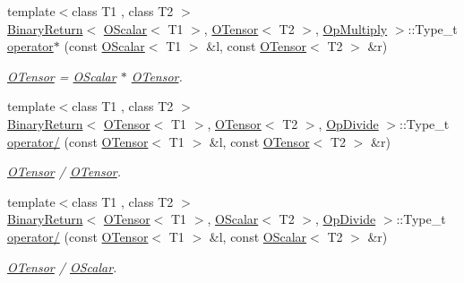 \begin{DoxyCompactItemize}
{\footnotesize template$<$class T1 , class T2 $>$ }\\\mbox{\hyperlink{structENSEM_1_1BinaryReturn}{Binary\+Return}}$<$ \mbox{\hyperlink{classENSEM_1_1OScalar}{O\+Scalar}}$<$ T1 $>$, \mbox{\hyperlink{classENSEM_1_1OTensor}{O\+Tensor}}$<$ T2 $>$, \mbox{\hyperlink{structENSEM_1_1OpMultiply}{Op\+Multiply}} $>$\+::Type\+\_\+t \mbox{\hyperlink{group__obstensor_gacf15f85a2bbaf20f2ccb489bd28690c6}{operator$\ast$}} (const \mbox{\hyperlink{classENSEM_1_1OScalar}{O\+Scalar}}$<$ T1 $>$ \&l, const \mbox{\hyperlink{classENSEM_1_1OTensor}{O\+Tensor}}$<$ T2 $>$ \&r)
\begin{DoxyCompactList}\small\item\em \mbox{\hyperlink{classENSEM_1_1OTensor}{O\+Tensor}} = \mbox{\hyperlink{classENSEM_1_1OScalar}{O\+Scalar}} $\ast$ \mbox{\hyperlink{classENSEM_1_1OTensor}{O\+Tensor}}. \end{DoxyCompactList}\item 
{\footnotesize template$<$class T1 , class T2 $>$ }\\\mbox{\hyperlink{structENSEM_1_1BinaryReturn}{Binary\+Return}}$<$ \mbox{\hyperlink{classENSEM_1_1OTensor}{O\+Tensor}}$<$ T1 $>$, \mbox{\hyperlink{classENSEM_1_1OTensor}{O\+Tensor}}$<$ T2 $>$, \mbox{\hyperlink{structENSEM_1_1OpDivide}{Op\+Divide}} $>$\+::Type\+\_\+t \mbox{\hyperlink{group__obstensor_gab78687abe74ea9ae63cc1a98de644b13}{operator/}} (const \mbox{\hyperlink{classENSEM_1_1OTensor}{O\+Tensor}}$<$ T1 $>$ \&l, const \mbox{\hyperlink{classENSEM_1_1OTensor}{O\+Tensor}}$<$ T2 $>$ \&r)
\begin{DoxyCompactList}\small\item\em \mbox{\hyperlink{classENSEM_1_1OTensor}{O\+Tensor}} / \mbox{\hyperlink{classENSEM_1_1OTensor}{O\+Tensor}}. \end{DoxyCompactList}\item 
{\footnotesize template$<$class T1 , class T2 $>$ }\\\mbox{\hyperlink{structENSEM_1_1BinaryReturn}{Binary\+Return}}$<$ \mbox{\hyperlink{classENSEM_1_1OTensor}{O\+Tensor}}$<$ T1 $>$, \mbox{\hyperlink{classENSEM_1_1OScalar}{O\+Scalar}}$<$ T2 $>$, \mbox{\hyperlink{structENSEM_1_1OpDivide}{Op\+Divide}} $>$\+::Type\+\_\+t \mbox{\hyperlink{group__obstensor_ga5810ade8421abe1d7a6cf07748ac83d3}{operator/}} (const \mbox{\hyperlink{classENSEM_1_1OTensor}{O\+Tensor}}$<$ T1 $>$ \&l, const \mbox{\hyperlink{classENSEM_1_1OScalar}{O\+Scalar}}$<$ T2 $>$ \&r)
\begin{DoxyCompactList}\small\item\em \mbox{\hyperlink{classENSEM_1_1OTensor}{O\+Tensor}} / \mbox{\hyperlink{classENSEM_1_1OScalar}{O\+Scalar}}. \end{DoxyCompactList}\item 

\end{DoxyCompactItemize}
